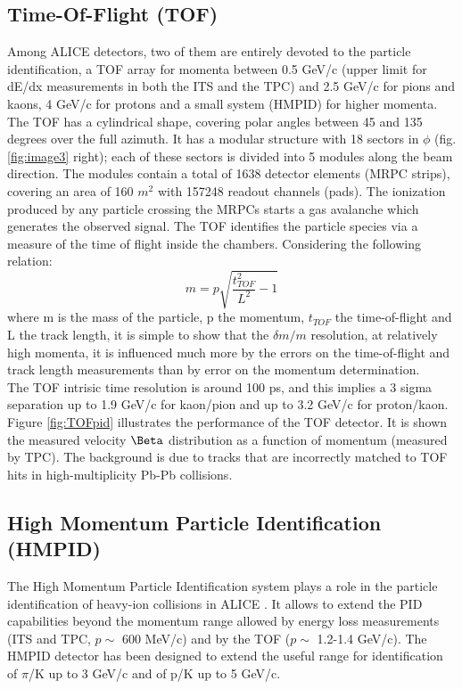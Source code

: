 \subsection{Time-Of-Flight (TOF)}
Among ALICE detectors, two of them are entirely devoted to the particle identification, a TOF array for momenta between 0.5 GeV/c (upper limit for dE/dx measurements in both the ITS and the TPC) and 2.5 GeV/c for pions and kaons, 4 GeV/c for protons and a small system (HMPID) for higher momenta. The TOF has a cylindrical shape, covering polar angles between 45 and 135 degrees over the full azimuth. It has a modular structure with 18 sectors in $\phi$ (fig. \ref{fig:image3} right); each of these sectors is divided into 5 modules along the beam direction. The modules contain a total of 1638 detector elements (MRPC strips), covering an area of 160 $m^2$ with 157248 readout channels (pads). The ionization produced by any particle crossing the MRPCs starts a gas avalanche which generates the observed signal. 
The TOF identifies the particle species via a measure of the time of flight 
inside the chambers. Considering the following relation:
\[
m = p \sqrt{\frac{t^2_{TOF}}{L^2}-1}
\]
where m is the mass of the particle, p the momentum, $t_{TOF}$ the time-of-flight and L  the track length, it is simple to show that the $\delta m/m$ resolution, at relatively high momenta, it is influenced much more by the errors on the time-of-flight and track length measurements than by error on the momentum determination.\\
The TOF intrisic time resolution is around 100 ps, and this implies a 3 sigma separation up to 1.9 GeV/c for kaon/pion and up to 3.2 GeV/c for proton/kaon.\\
Figure \ref{fig:TOFpid} illustrates the performance of the TOF detector. It is shown the measured velocity $\Beta$ distribution as a function of momentum (measured by TPC). The background is due to tracks that are incorrectly matched to TOF hits in high-multiplicity Pb-Pb collisions.

\subsection{High Momentum Particle Identification (HMPID)}
The High Momentum Particle Identification system plays a role in the particle identification of heavy-ion collisions in ALICE \cite{HMPID-TDR}. It allows to extend the PID capabilities beyond the momentum range allowed by energy loss measurements (ITS and TPC, $p \sim$ 600 MeV/c) and by the TOF ($p \sim$ 1.2-1.4 GeV/c). The HMPID detector has been designed to extend the useful range for identification of $\pi$/K up to 3 GeV/c and of p/K up to 5 GeV/c. 


